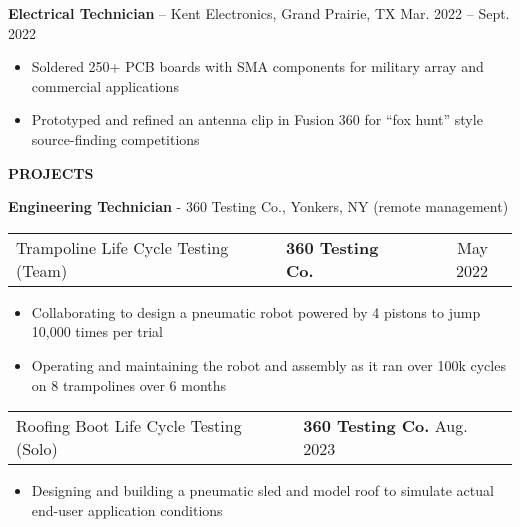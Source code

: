 \documentclass[18pt]{article}
\begin{document}
\vspace{-0.5\baselineskip}
\textbf{Electrical Technician} – Kent Electronics, Grand Prairie, TX \hfill Mar. 2022 – Sept. 2022

\begin{itemize}[noitemsep]
    \vspace{-0.75\baselineskip}
    \item Soldered 250+ PCB boards with SMA components for military array and commercial applications
    \item Prototyped and refined an antenna clip in Fusion 360 for “fox hunt” style source-finding competitions 
\end{itemize}



\vspace{-1.25\baselineskip}
\begin{center}
    \textbf{PROJECTS}
    \hrulefill
\end{center}
\vspace{-0.5\baselineskip}
\textbf{Engineering Technician} - 360 Testing Co., Yonkers, NY (remote management) 

\begin{tabularx}{\textwidth}{l | X | r | r}
    Trampoline Life Cycle Testing (Team) 
    &
    \textbf{360 Testing Co.}
    &
    May 2022
\end{tabularx}

\begin{itemize}[noitemsep]
    \vspace{-0.75\baselineskip}
    \item Collaborating to design a pneumatic robot powered by 4 pistons to jump 10,000 times per trial
    \item Operating and maintaining the robot and assembly as it ran over 100k cycles on 8 trampolines over 6 months
\end{itemize}

\vspace{-0.5\baselineskip}
\begin{tabular}{p{} p{} }
    Roofing Boot Life Cycle Testing (Solo)
    &
    \textbf{360 Testing Co.}
    \hfill Aug. 2023
\end{tabular}

\begin{itemize}[noitemsep]
    \vspace{-0.75\baselineskip}
    \item Designing and building a pneumatic sled and model roof to simulate actual end-user application conditions 
\end{itemize}
\end{document}
